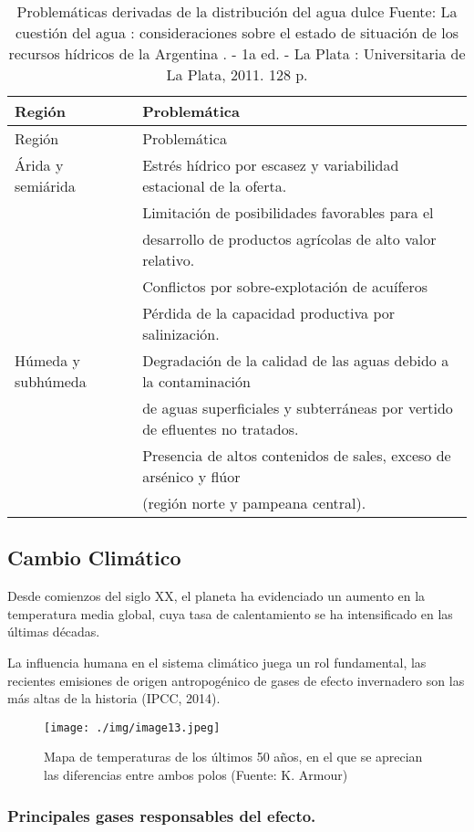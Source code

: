 \documentclass[
  a4paper,12pt]{extarticle}
\begin{document}
\begin{longtable}[]{@{}ll@{}}
\caption{Problemáticas derivadas de la distribución del agua dulce
Fuente: La cuestión del agua : consideraciones sobre el estado de
situación de los recursos hídricos de la Argentina . - 1a ed. - La Plata
: Universitaria de La Plata, 2011. 128 p.}\tabularnewline
\toprule
Región & Problemática\tabularnewline
\midrule
\endfirsthead
\toprule
Región & Problemática\tabularnewline
\midrule
\endhead
Árida y semiárida & Estrés hídrico por escasez y variabilidad estacional
de la oferta.\tabularnewline
& Limitación de posibilidades favorables para el\tabularnewline
& desarrollo de productos agrícolas de alto valor
relativo.\tabularnewline
& Conflictos por sobre-explotación de acuíferos\tabularnewline
& Pérdida de la capacidad productiva por salinización.\tabularnewline
Húmeda y subhúmeda & Degradación de la calidad de las aguas debido a la
contaminación\tabularnewline
& de aguas superficiales y subterráneas por vertido de efluentes no
tratados.\tabularnewline
& Presencia de altos contenidos de sales, exceso de arsénico y
flúor\tabularnewline
& (región norte y pampeana central).\tabularnewline
\bottomrule
\end{longtable}

\hypertarget{cambio-climuxe1tico}{%
\subsection{Cambio Climático}\label{cambio-climuxe1tico}}

Desde comienzos del siglo XX, el planeta ha evidenciado un aumento en la
temperatura media global, cuya tasa de calentamiento se ha intensificado
en las últimas décadas.

La influencia humana en el sistema climático juega un rol fundamental,
las recientes emisiones de origen antropogénico de gases de efecto
invernadero son las más altas de la historia (IPCC, 2014).

\begin{figure}
\centering
\texttt{[image: ./img/image13.jpeg]}
\caption{Mapa de temperaturas de los últimos 50 años, en el que se
aprecian las diferencias entre ambos polos (Fuente: K. Armour)}
\end{figure}

\hypertarget{principales-gases-responsables-del-efecto.}{%
\subsubsection{Principales gases responsables del
efecto.}\label{principales-gases-responsables-del-efecto.}}
\end{document}
